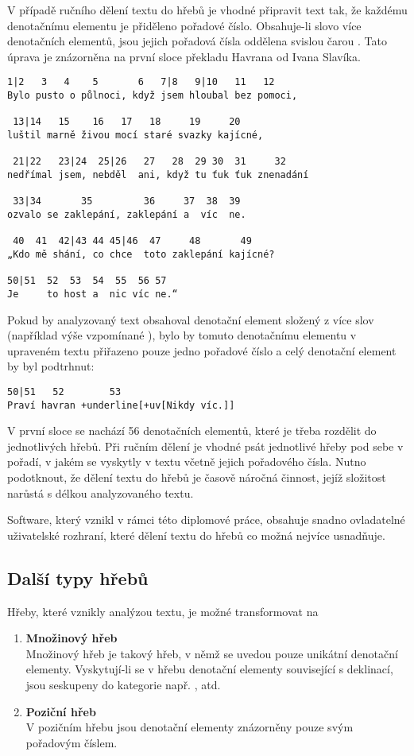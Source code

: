 \documentclass[dp.tex]{subfiles}
\begin{document}
V případě ručního dělení textu do hřebů je vhodné připravit text tak, že každému denotačnímu elementu je přiděleno pořadové číslo. Obsahuje-li slovo více denotačních elementů, jsou jejich pořadová čísla oddělena svislou čarou \uv{|}. Tato úprava je znázorněna na první sloce překladu Havrana od Ivana Slavíka.

\begin{samepage}
\begin{Verbatim}[commandchars=+\[\]]
 1|2   3   4    5       6   7|8   9|10   11   12
Bylo pusto o půlnoci, když jsem hloubal bez pomoci,

 13|14   15    16   17   18     19     20
luštil marně živou mocí staré svazky kajícné,

 21|22   23|24  25|26   27   28  29 30  31     32
nedřímal jsem, nebděl  ani, když tu ťuk ťuk znenadání

 33|34       35         36     37  38  39
ozvalo se zaklepání, zaklepání a  víc  ne.

 40  41  42|43 44 45|46  47     48       49
„Kdo mě shání, co chce  toto zaklepání kajícné?

50|51  52  53  54  55  56 57
Je     to host a  nic víc ne.“
\end{Verbatim}
\end{samepage}

Pokud by analyzovaný text obsahoval denotační element složený z více slov (například výše vzpomínané ), bylo by tomuto denotačnímu elementu v upraveném textu přiřazeno pouze jedno pořadové číslo a celý denotační element by byl podtrhnut:
\begin{Verbatim}[commandchars=+\[\]]
50|51   52        53
Praví havran +underline[+uv[Nikdy víc.]]
\end{Verbatim}

V první sloce se nachází 56 denotačních elementů, které je třeba rozdělit do jednotlivých hřebů. Při ručním dělení je vhodné psát jednotlivé hřeby pod sebe v pořadí, v jakém se vyskytly v textu včetně jejich pořadového čísla. Nutno podotknout, že dělení textu do hřebů je časově náročná činnost, jejíž složitost narůstá s délkou analyzovaného textu.

Software, který vznikl v rámci této diplomové práce, obsahuje snadno ovladatelné uživatelské rozhraní, které dělení textu do hřebů co možná nejvíce usnadňuje.

\subsection{Další typy hřebů}
Hřeby, které vznikly analýzou textu, je možné transformovat na
\begin{enumerate}
\item \textbf{Množinový hřeb}\\
Množinový hřeb je takový hřeb, v němž se uvedou pouze unikátní denotační elementy. Vyskytují-li se v hřebu denotační elementy související s deklinací, jsou seskupeny do kategorie např. ,  atd.
\item \textbf{Poziční hřeb}\\
V pozičním hřebu jsou denotační elementy znázorněny pouze svým pořadovým číslem.
\end{enumerate}
\end{document}
